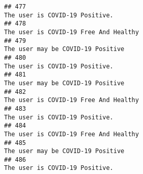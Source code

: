 \documentclass[
]{article}
\begin{document}
\begin{verbatim}
## 477                                                                                                                                                                                                                                     The user is COVID-19 Positive.
## 478                                                                                                                                                                                                                              The user is COVID-19 Free And Healthy
## 479                                                                                                                                                                                                                                  The user may be COVID-19 Positive
## 480                                                                                                                                                                                                                                     The user is COVID-19 Positive.
## 481                                                                                                                                                                                                                                  The user may be COVID-19 Positive
## 482                                                                                                                                                                                                                              The user is COVID-19 Free And Healthy
## 483                                                                                                                                                                                                                                     The user is COVID-19 Positive.
## 484                                                                                                                                                                                                                              The user is COVID-19 Free And Healthy
## 485                                                                                                                                                                                                                                  The user may be COVID-19 Positive
## 486                                                                                                                                                                                                                                     The user is COVID-19 Positive.

\end{verbatim}
\end{document}
